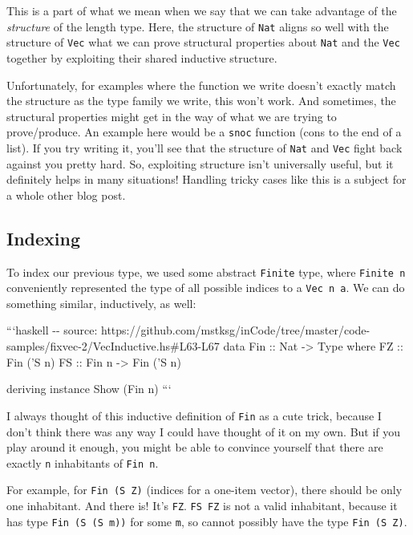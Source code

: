 \documentclass[]{article}
\begin{document}
This is a part of what we mean when we say that we can take advantage of the
\emph{structure} of the length type. Here, the structure of \texttt{Nat} aligns
so well with the structure of \texttt{Vec} what we can prove structural
properties about \texttt{Nat} and the \texttt{Vec} together by exploiting their
shared inductive structure.

Unfortunately, for examples where the function we write doesn't exactly match
the structure as the type family we write, this won't work. And sometimes, the
structural properties might get in the way of what we are trying to
prove/produce. An example here would be a \texttt{snoc} function (cons to the
end of a list). If you try writing it, you'll see that the structure of
\texttt{Nat} and \texttt{Vec} fight back against you pretty hard. So, exploiting
structure isn't universally useful, but it definitely helps in many situations!
Handling tricky cases like this is a subject for a whole other blog post.

\subsection{Indexing}

To index our previous type, we used some abstract \texttt{Finite} type, where
\texttt{Finite\ n} conveniently represented the type of all possible indices to
a \texttt{Vec\ n\ a}. We can do something similar, inductively, as well:

```haskell -\/- source:
https://github.com/mstksg/inCode/tree/master/code-samples/fixvec-2/VecInductive.hs\#L63-L67
data Fin :: Nat -\textgreater{} Type where FZ :: Fin ('S n) FS :: Fin n
-\textgreater{} Fin ('S n)

deriving instance Show (Fin n) ```

I always thought of this inductive definition of \texttt{Fin} as a cute trick,
because I don't think there was any way I could have thought of it on my own.
But if you play around it enough, you might be able to convince yourself that
there are exactly \texttt{n} inhabitants of \texttt{Fin\ n}.

For example, for \texttt{Fin\ (\textquotesingle{}S\ \textquotesingle{}Z)}
(indices for a one-item vector), there should be only one inhabitant. And there
is! It's \texttt{FZ}. \texttt{FS\ FZ} is not a valid inhabitant, because it has
type \texttt{Fin\ (\textquotesingle{}S\ (\textquotesingle{}S\ m))} for some
\texttt{m}, so cannot possibly have the type
\texttt{Fin\ (\textquotesingle{}S\ \textquotesingle{}Z)}.
\end{document}
